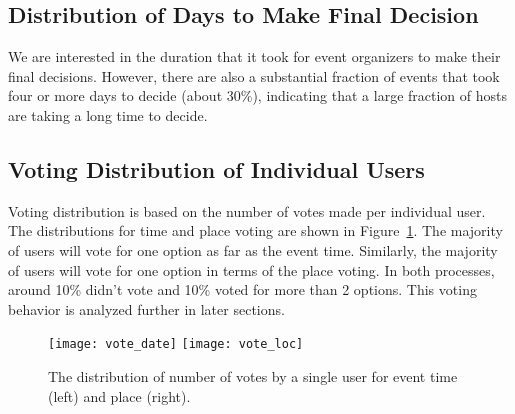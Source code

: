 \subsection{Distribution of Days to Make Final Decision}
We are interested in the duration that it took for event organizers to make their final decisions. 
 However, there are also a substantial fraction of events that took four or more days to decide (about 30\%), indicating that a large fraction of hosts are taking a long time to decide. 

\subsection{Voting Distribution of Individual Users}
Voting distribution is based on the number of votes made per individual user. The distributions for time 
and place voting are shown in Figure~\ref{fig:votedis}. The majority of users will vote for one 
option as far as the event time.  Similarly, the majority of users will vote for one option in terms of the place voting. In both processes, around 10\% didn't vote and 10\% voted for more than
2 options.  This voting behavior is analyzed further in later sections.
\iffalse
To better understand the group voting process, we analyzed all these votes and observed 
some interesting patterns regarding group users' voting behaviors. This will be further
discussed in later sections.
\fi
\begin{figure}
\centering
\texttt{[image: vote\_date]}
\texttt{[image: vote\_loc]}
\caption{The distribution of number of votes by a single user for event time (left) and place (right).}
\label{fig:votedis}
\end{figure}

